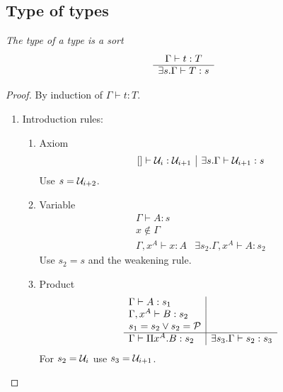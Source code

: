 \subsection{Type of types}

\begin{theorem}
    \label{TypeOfTypes}
    \emph{The type of a type is a sort}
    $$
    \begin{array}{c} 
        \Gamma \vdash t: T
     \\ \hline 
        \exists s. \Gamma \vdash T : s
    \end{array}
    $$

    \begin{proof}
        By induction of $\Gamma \vdash t : T$.
        \begin{enumerate}
            \item Introduction rules:
            \begin{enumerate}
                \item Axiom
                $$
                \begin{array}{l|l}
                    [] \vdash {\cal U}_i : {\cal U}_{i+1}
                    &
                    \exists s. \Gamma \vdash {\cal U}_{i+1}: s
                \end{array}
                $$
                Use $s = {\cal U}_{i+2}$.

                \item Variable
                $$
                \begin{array}{l|l}
                    \Gamma \vdash A : s
                    \\
                    x \notin \Gamma
                    \\
                    \hline
                    \Gamma, x^A \vdash x: A
                    &
                    \exists s_2. \Gamma,x^A \vdash A: s_2
                \end{array}
                $$
                Use $s_2 = s$ and the weakening rule.

                \item Product
                $$
                \begin{array}{l|l}
                    \Gamma \vdash A : s_1
                    \\
                    \Gamma,x^A \vdash B: s_2
                    \\
                    s_1 = s_2 \lor s_2 = {\cal P}
                    \\
                    \hline
                    \Gamma \vdash \Pi x^A. B : s_2
                    &
                    \exists s_3. \Gamma \vdash s_2: s_3
                \end{array}
                $$
                For $s_2 = {\cal U}_i$ use $s_3 = {\cal U}_{i+1}$.


\end{enumerate}
\end{enumerate}
\end{proof}
\end{theorem}
